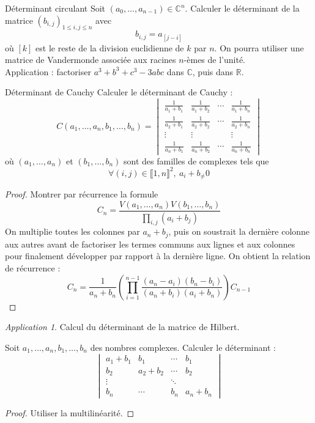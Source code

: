 \documentclass[french,a4paper]{article}
\newcommand{\R}{\mathbb{R}}
\newcommand{\C}{\mathbb{C}}
\theoremstyle{plain}
\theoremstyle{definition}
\theoremstyle{remark}
\newtheorem*{app}{Application}
\begin{document}
\begin{ex}{Déterminant circulant}
	Soit $(a_0,\ldots,a_{n-1})\in\C^n$. Calculer le déterminant de la matrice $(b_{i,j})_{1\leqslant i,j\leqslant n}$ avec $$b_{i,j}=a_{[j-i]}$$ où $[k]$ est le reste de la division euclidienne de $k$ par $n$. On pourra utiliser une matrice de Vandermonde associée aux racines $n$-èmes de l'unité. \\
	Application : factoriser $a^3+b^3+c^3-3abc$ dans $\C$, puis dans $\R$.
\end{ex}

\begin{ex}{Déterminant de Cauchy}
	Calculer le déterminant de Cauchy : $$C(a_1,\ldots,a_n,b_1,\ldots,b_n)=\displaystyle\begin{vmatrix}
		\displaystyle\frac{1}{a_1+b_1}&\displaystyle\frac{1}{a_1+b_2}&\cdots&\displaystyle\frac{1}{a_1+b_n}\\
		\displaystyle\frac{1}{a_2+b_1}&\displaystyle\frac{1}{a_2+b_2}&\cdots&\displaystyle\frac{1}{a_2+b_n}\\
		\vdots&\vdots&&\vdots\\
		\displaystyle\frac{1}{a_n+b_1}&\displaystyle\frac{1}{a_n+b_2}&\cdots&\displaystyle\frac{1}{a_n+b_n}
	\end{vmatrix}$$ où $(a_1,\ldots,a_n)$ et $(b_1,\ldots,b_n)$ sont des familles de complexes tels que $$\forall (i,j)\in\llbracket1,n\rrbracket^2,\ a_i+b_\ne 0$$
\end{ex}
\begin{proof}
	Montrer par récurrence la formule $$C_n=\frac{V(a_1,\ldots,a_n)V(b_1,\ldots,b_n)}{\prod_{i,j}(a_i+b_j)}$$On multiplie toutes les colonnes par $a_n+b_j$, puis on soustrait la dernière colonne aux autres avant de factoriser les termes communs aux lignes et aux colonnes pour finalement développer par rapport à la dernière ligne. On obtient la relation de récurrence : $$C_n=\frac{1}{a_n+b_n}\left(\prod_{i=1}^{n-1}\frac{(a_n-a_i)(b_n-b_i)}{(a_n+b_i)(a_i+b_n)}\right)C_{n-1}$$
\end{proof}
\begin{app}
	Calcul du déterminant de la matrice de Hilbert.
\end{app}

\begin{ex}{}
	Soit $a_1,\ldots,a_n,b_1,\ldots,b_n$ des nombres complexes. Calculer le déterminant : $$\begin{vmatrix}
		a_1+b_1&b_1&\cdots&b_1\\
		b_2&a_2+b_2&\cdots&b_2\\
		\vdots&&\ddots&\\
		b_n&\cdots&b_n&a_n+b_n
	\end{vmatrix}$$
\end{ex}
\begin{proof}
	Utiliser la multilinéarité.
\end{proof}
\end{document}
